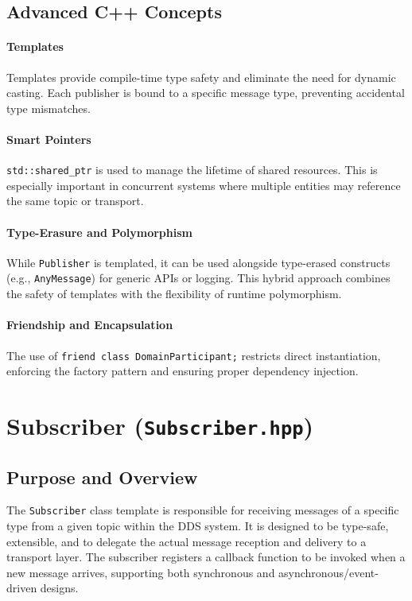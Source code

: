 \documentclass[12pt]{report}
\begin{document}
\subsection{Advanced C++ Concepts}
\paragraph{Templates}
Templates provide compile-time type safety and eliminate the need for dynamic casting. Each publisher is bound to a specific message type, preventing accidental type mismatches.

\paragraph{Smart Pointers}
\texttt{std::shared\_ptr} is used to manage the lifetime of shared resources. This is especially important in concurrent systems where multiple entities may reference the same topic or transport.

\paragraph{Type-Erasure and Polymorphism}
While \texttt{Publisher} is templated, it can be used alongside type-erased constructs (e.g., \texttt{AnyMessage}) for generic APIs or logging. This hybrid approach combines the safety of templates with the flexibility of runtime polymorphism.

\paragraph{Friendship and Encapsulation}
The use of \texttt{friend class DomainParticipant;} restricts direct instantiation, enforcing the factory pattern and ensuring proper dependency injection.

\section{Subscriber (\texttt{Subscriber.hpp})}

\subsection{Purpose and Overview}
The \texttt{Subscriber} class template is responsible for receiving messages of a specific type from a given topic within the DDS system. It is designed to be type-safe, extensible, and to delegate the actual message reception and delivery to a transport layer. The subscriber registers a callback function to be invoked when a new message arrives, supporting both synchronous and asynchronous/event-driven designs.
\end{document}
